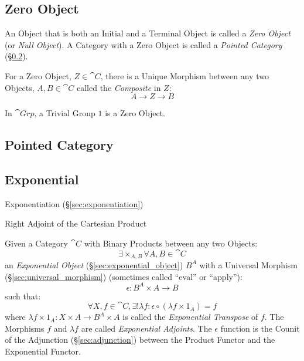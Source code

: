 \subsection{Zero Object}\label{sec:zero_object}

An Object that is both an Initial and a Terminal Object is called a \emph{Zero
Object} (or \emph{Null Object}). A Category with a Zero Object is called a
\emph{Pointed Category} (\S\ref{sec:pointed_category}).

For a Zero Object, $Z \in \cat{C}$, there is a Unique Morphism between any two
Objects, $A, B \in \cat{C}$ called the \emph{Composite} in $Z$:
\[
  A \rightarrow Z \rightarrow B
\]

In $\cat{Grp}$, a Trivial Group ${1}$ is a Zero Object.



\subsection{Pointed Category}\label{sec:pointed_category}



\subsection{Exponential}\label{sec:category_exponential}

\fist Exponentiation (\S\ref{sec:exponentiation})

Right Adjoint of the Cartesian Product

Given a Category $\cat{C}$ with Binary Products between any two
Objects:
\[
  \exists \times_{A,B} \forall A,B \in \cat{C}
\]
an \emph{Exponential Object} (\S\ref{sec:exponential_object}) $B^A$
with a Universal Morphism (\S\ref{sec:universal_morphism}) (sometimes
called ``eval'' or ``apply''):
\[
  \epsilon : B^A \times A \rightarrow B
\]
such that:
\[
  \forall X, f \in \cat{C}, \exists ! \lambda f :
  \epsilon \circ (\lambda f \times 1_A) = f
\]
where $\lambda f \times 1_A : X \times A \rightarrow B^A \times A$ is
called the \emph{Exponential Transpose} of $f$. The Morphisms $f$ and
$\lambda f$ are called \emph{Exponential Adjoints}. The $\epsilon$
function is the Counit of the Adjunction (\S\ref{sec:adjunction}) between
the Product Functor and the Exponential Functor.

